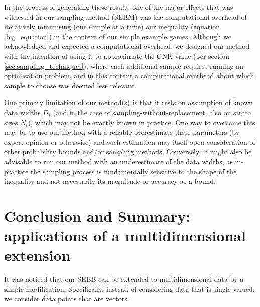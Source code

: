 In the process of generating these results one of the major effects that was witnessed in our sampling method (SEBM) was the computational overhead of iteratively minimising (one sample at a time) our inequality (equation \ref{big_equation}) in the context of our simple example games.
Although we acknowledged and expected a computational overhead, we designed our method with the intention of using it to approximate the GNK value (per section \ref{sec:sampling_techniques}), where each additional sample requires running an optimisation problem, and in this context a computational overhead about which sample to choose was deemed less relevant.


% 

One primary limitation of our method(s) is that it rests on assumption of known data widths $D_i$ (and in the case of sampling-without-replacement, also on strata sizes $N_i$), which may not be exactly known in practice.
One way to overcome this may be to use our method with a reliable overestimate these parameters (by expert opinion or otherwise) and such estimation may itself open consideration of other probability bounds and/or sampling methods.
Conversely, it might also be advisable to run our method with an underestimate of the data widths, as in-practice the sampling process is fundamentally sensitive to the shape of the inequality and not necessarily its magnitude or accuracy as a bound.








\section{Conclusion and Summary: applications of a multidimensional extension}\label{sec:multi}

It was noticed that our SEBB can be extended to multidimensional data by a simple modification.
Specifically, instead of considering data that is single-valued, we consider data points that are vectors. 

